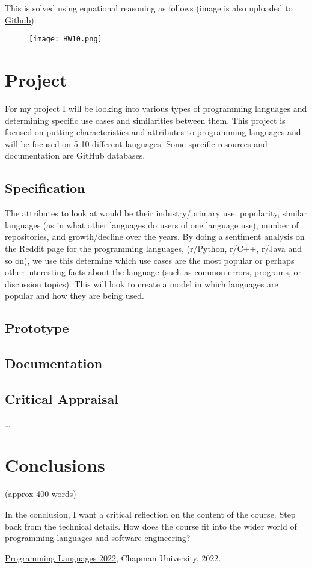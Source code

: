 \documentclass{article}
\theoremstyle{theorem}
\theoremstyle{definition}
\theoremstyle{remark}
\begin{document}
This is solved using equational reasoning as follows (image is also uploaded to \href{https://github.com/dapak2002/Pak-D-CPSC-354-Report/blob/main/src/HW10.png}{Github}):

\begin{figure}[htp]
    \centering
    \texttt{[image: HW10.png]}
\end{figure}


\section{Project}

For my project I will be looking into various types of programming languages and determining specific use cases and similarities between them. This project is focused on putting characteristics and attributes to programming languages and will be focused on 5-10 different languages. Some specific resources and documentation are GitHub databases.
\subsection{Specification}
The attributes to look at would be their industry/primary use, popularity, similar languages (as in what other languages do users of one language use), number of repositories, and growth/decline over the years. By doing a sentiment analysis on the Reddit page for the programming languages, (r/Python, r/C++, r/Java and so on), we use this determine which use cases are the most popular or perhaps other interesting facts about the language (such as common errors, programs, or discussion topics). This will look to create a model in which languages are popular and how they are being used.

\subsection{Prototype}
\subsection{Documentation}
\subsection{Critical Appraisal}

\ldots

\section{Conclusions}\label{conclusions}

(approx 400 words)

In the conclusion, I want a critical reflection on the content of the course. Step back from the technical details. How does the course fit into the wider world of programming languages and software engineering?

\begin{thebibliography}{99}
 \href{https://github.com/alexhkurz/programming-languages-2022/blob/main/README.md}{Programming Languages 2022}, Chapman University, 2022.
\end{thebibliography}
\end{document}
